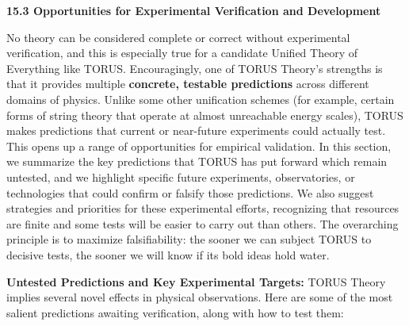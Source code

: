 \documentclass[
]{article}
\begin{document}
{\textbf{15.3 Opportunities for Experimental Verification and
Development}

No theory can be considered complete or correct without experimental
verification, and this is especially true for a candidate Unified Theory
of Everything like TORUS. Encouragingly, one of TORUS Theory's strengths
is that it provides multiple \textbf{concrete, testable predictions}
across different domains of physics. Unlike some other unification
schemes (for example, certain forms of string theory that operate at
almost unreachable energy scales), TORUS makes predictions that current
or near-future experiments could actually test\hspace{0pt}. This opens
up a range of opportunities for empirical validation. In this section,
we summarize the key predictions that TORUS has put forward which remain
untested, and we highlight specific future experiments, observatories,
or technologies that could confirm or falsify those predictions. We also
suggest strategies and priorities for these experimental efforts,
recognizing that resources are finite and some tests will be easier to
carry out than others. The overarching principle is to maximize
falsifiability: the sooner we can subject TORUS to decisive tests, the
sooner we will know if its bold ideas hold water.

\textbf{Untested Predictions and Key Experimental Targets:} TORUS Theory
implies several novel effects in physical observations. Here are some of
the most salient predictions awaiting verification, along with how to
test them:

}
\end{document}
